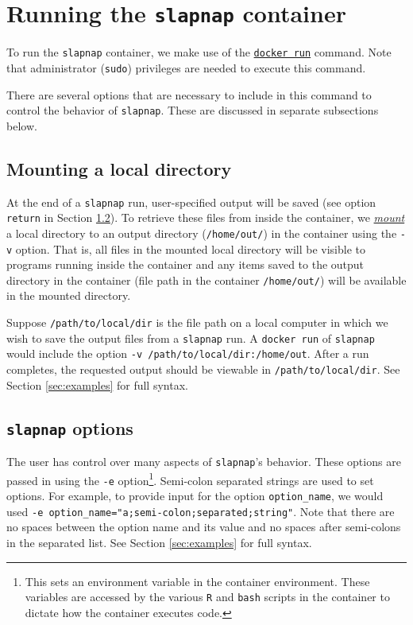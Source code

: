 \documentclass[]{article}
\begin{document}
\section{\texorpdfstring{Running the \texttt{slapnap}
container}{Running the slapnap container}}\label{sec:runningcontainer}

To run the \texttt{slapnap} container, we make use of the
\href{https://docs.docker.com/engine/reference/run/}{\texttt{docker\ run}}
command. Note that administrator (\texttt{sudo}) privileges are needed
to execute this command.

There are several options that are necessary to include in this command
to control the behavior of \texttt{slapnap}. These are discussed in
separate subsections below.

\subsection{Mounting a local directory}\label{sec:mounting}

At the end of a \texttt{slapnap} run, user-specified output will be
saved (see option \texttt{return} in Section \ref{sec:opts}). To
retrieve these files from inside the container, we
\href{https://docs.docker.com/storage/bind-mounts/}{\emph{mount}} a
local directory to an output directory (\texttt{/home/out/}) in the
container using the \texttt{-v} option. That is, all files in the
mounted local directory will be visible to programs running inside the
container and any items saved to the output directory in the container
(file path in the container \texttt{/home/out/}) will be available in
the mounted directory.

Suppose \texttt{/path/to/local/dir} is the file path on a local computer
in which we wish to save the output files from a \texttt{slapnap} run. A
\texttt{docker\ run} of \texttt{slapnap} would include the option
\texttt{-v\ /path/to/local/dir:/home/out}. After a run completes, the
requested output should be viewable in \texttt{/path/to/local/dir}. See
Section \ref{sec:examples} for full syntax.

\subsection{\texorpdfstring{\texttt{slapnap}
options}{slapnap options}}\label{sec:opts}

The user has control over many aspects of \texttt{slapnap}'s behavior.
These options are passed in using the \texttt{-e} option\footnote{This
  sets an environment variable in the container environment. These
  variables are accessed by the various \texttt{R} and \texttt{bash}
  scripts in the container to dictate how the container executes code.}.
Semi-colon separated strings are used to set options. For example, to
provide input for the option \texttt{option\_name}, we would used
\texttt{-e\ option\_name="a;semi-colon;separated;string"}. Note that
there are no spaces between the option name and its value and no spaces
after semi-colons in the separated list. See Section \ref{sec:examples}
for full syntax.
\end{document}
